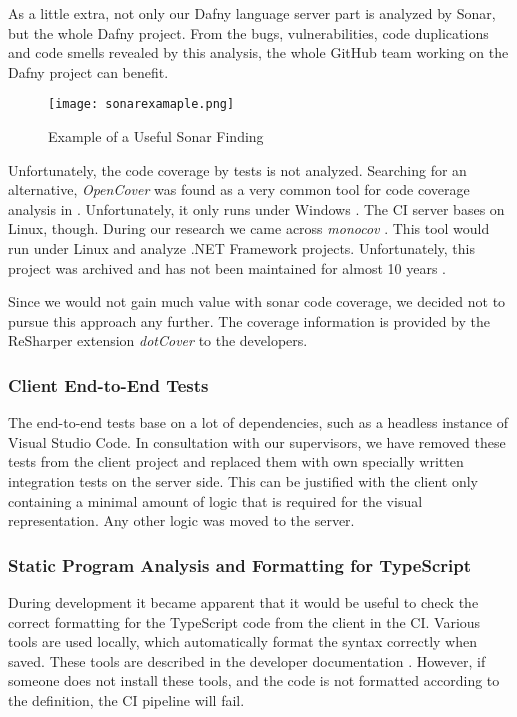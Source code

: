 As a little extra, not only our Dafny language server part is analyzed by Sonar,
but the whole Dafny project.
From the bugs, vulnerabilities, code duplications and code smells revealed
by this analysis, the whole GitHub team working on the Dafny project can benefit. \\

\begin{figure}[H]
    \centering
    \texttt{[image: sonarexamaple.png]}
    \caption{Example of a Useful Sonar Finding}
    \label{fig:sonarexample}
\end{figure}

Unfortunately, the code coverage by tests is not analyzed.
Searching for an alternative, \textit{OpenCover} was found as a very common tool for code coverage analysis in \Csharp.
Unfortunately, it only runs under Windows  \cite{opencover}.
The CI server bases on Linux, though.
During our research we came across \textit{monocov} \cite{monocov}.
This tool would run under Linux and analyze .NET Framework projects.
Unfortunately, this project was archived and has not been maintained for almost 10 years \cite{monocov}.

Since we would not gain much value with sonar code coverage, we decided not to pursue this approach any further.
The coverage information is provided by the ReSharper extension \textit{dotCover} \cite{dotcover} to the developers.

\subsubsection{Client End-to-End Tests}
The end-to-end tests base on a lot of dependencies, such as a headless instance of Visual Studio Code.
In consultation with our supervisors, we have removed these tests from the client project and replaced them with own specially written integration tests on the server side.
This can be justified with the client only containing a minimal amount of logic that is required for the visual representation.
Any other logic was moved to the server.

\subsubsection{Static Program Analysis and Formatting for TypeScript}
During development it became apparent that it would be useful to check the correct formatting
for the TypeScript code from the client in the CI.
Various tools are used locally, which automatically format the syntax correctly when saved.
These tools are described in the developer documentation \cite{dev}.
However, if someone does not install these tools,
and the code is not formatted according to the definition,
the CI pipeline will fail. \\

